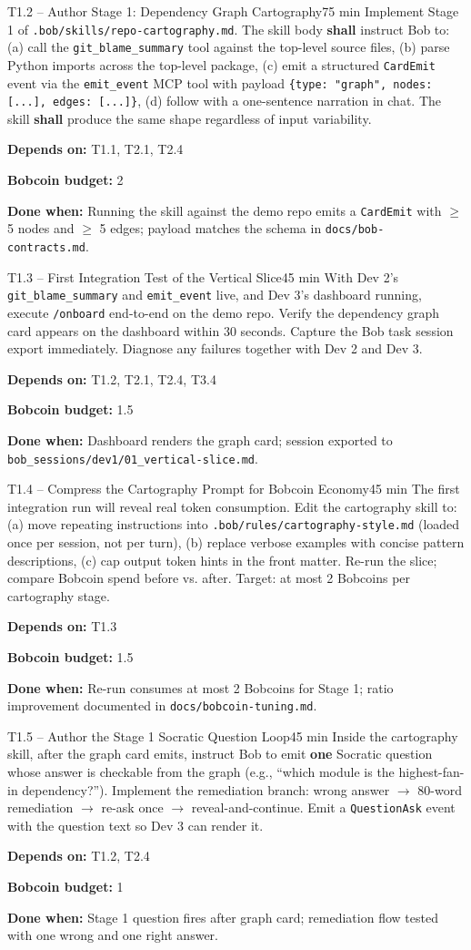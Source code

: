 \documentclass[11pt,letterpaper]{article}
\newcommand{\acceptance}[1]{\par\smallskip\textcolor{ibmgreen}{\textbf{Done when:}} #1}
\newcommand{\depends}[1]{\par\smallskip\textcolor{ibmorange}{\textbf{Depends on:}} #1}
\newcommand{\bobcost}[1]{\par\smallskip\textcolor{ibmaccent}{\textbf{Bobcoin budget:}} #1}
\newcommand{\shall}{\textbf{shall}}
\begin{document}
\begin{task}{T1.2 -- Author Stage 1: Dependency Graph Cartography}{75 min}
Implement Stage 1 of \texttt{.bob/skills/repo-cartography.md}. The skill body \shall{} instruct Bob to: (a) call the \texttt{git\_blame\_summary} tool against the top-level source files, (b) parse Python imports across the top-level package, (c) emit a structured \texttt{CardEmit} event via the \texttt{emit\_event} MCP tool with payload \texttt{\{type: "graph", nodes: [...], edges: [...]\}}, (d) follow with a one-sentence narration in chat. The skill \shall{} produce the same shape regardless of input variability.
\depends{T1.1, T2.1, T2.4}
\bobcost{2}
\acceptance{Running the skill against the demo repo emits a \texttt{CardEmit} with $\geq$ 5 nodes and $\geq$ 5 edges; payload matches the schema in \texttt{docs/bob-contracts.md}.}
\end{task}

\begin{task}{T1.3 -- First Integration Test of the Vertical Slice}{45 min}
With Dev 2's \texttt{git\_blame\_summary} and \texttt{emit\_event} live, and Dev 3's dashboard running, execute \texttt{/onboard} end-to-end on the demo repo. Verify the dependency graph card appears on the dashboard within 30 seconds. Capture the Bob task session export immediately. Diagnose any failures together with Dev 2 and Dev 3.
\depends{T1.2, T2.1, T2.4, T3.4}
\bobcost{1.5}
\acceptance{Dashboard renders the graph card; session exported to \texttt{bob\_sessions/dev1/01\_vertical-slice.md}.}
\end{task}

\begin{task}{T1.4 -- Compress the Cartography Prompt for Bobcoin Economy}{45 min}
The first integration run will reveal real token consumption. Edit the cartography skill to: (a) move repeating instructions into \texttt{.bob/rules/cartography-style.md} (loaded once per session, not per turn), (b) replace verbose examples with concise pattern descriptions, (c) cap output token hints in the front matter. Re-run the slice; compare Bobcoin spend before vs. after. Target: at most 2 Bobcoins per cartography stage.
\depends{T1.3}
\bobcost{1.5}
\acceptance{Re-run consumes at most 2 Bobcoins for Stage 1; ratio improvement documented in \texttt{docs/bobcoin-tuning.md}.}
\end{task}

\begin{task}{T1.5 -- Author the Stage 1 Socratic Question Loop}{45 min}
Inside the cartography skill, after the graph card emits, instruct Bob to emit \textbf{one} Socratic question whose answer is checkable from the graph (e.g., ``which module is the highest-fan-in dependency?''). Implement the remediation branch: wrong answer $\rightarrow$ 80-word remediation $\rightarrow$ re-ask once $\rightarrow$ reveal-and-continue. Emit a \texttt{QuestionAsk} event with the question text so Dev 3 can render it.
\depends{T1.2, T2.4}
\bobcost{1}
\acceptance{Stage 1 question fires after graph card; remediation flow tested with one wrong and one right answer.}
\end{task}
\end{document}
